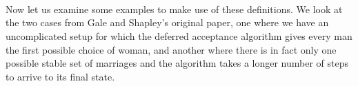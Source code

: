 {\begin{code}
\AgdaSymbol{)}\AgdaSpace{}%
\AgdaOperator{\AgdaInductiveConstructor{,}}\AgdaSpace{}%
\AgdaSpace{}%
\AgdaSymbol{(}\AgdaSpace{}%
\AgdaSymbol{)}\AgdaSpace{}%
\AgdaSymbol{)}\AgdaSpace{}%
\AgdaOperator{\AgdaInductiveConstructor{,}}\<%
\\
\>[.]\<[2578I]%
\>[12]\AgdaSymbol{(}\AgdaSpace{}%
\AgdaSymbol{(}\AgdaSpace{}%
\AgdaSymbol{)}\AgdaSpace{}%
\AgdaOperator{\AgdaInductiveConstructor{,}}\AgdaSpace{}%
\AgdaSpace{}%
\AgdaSymbol{(}\AgdaSpace{}%
\AgdaSymbol{)}\AgdaSpace{}%
\AgdaSymbol{))}\<%
\\
%
\>[10]\AgdaSymbol{(}%
\>[2594I]\AgdaSymbol{(}\AgdaSpace{}%
\AgdaSymbol{(}\AgdaSpace{}%
\AgdaSymbol{)}\AgdaSpace{}%
\AgdaOperator{\AgdaInductiveConstructor{,}}\AgdaSpace{}%
\AgdaSpace{}%
\AgdaSymbol{(}\AgdaSpace{}%
\AgdaSymbol{)}\AgdaSpace{}%
\AgdaSymbol{)}\AgdaSpace{}%
\AgdaOperator{\AgdaInductiveConstructor{,}}\<%
\\
\>[.]\<[2594I]%
\>[12]\AgdaSymbol{(}\AgdaSpace{}%
\AgdaSymbol{(}\AgdaSpace{}%
\AgdaSymbol{)}\AgdaSpace{}%
\AgdaOperator{\AgdaInductiveConstructor{,}}\AgdaSpace{}%
\AgdaSpace{}%
\AgdaSymbol{(}\AgdaSpace{}%
\AgdaSymbol{)}\AgdaSpace{}%
\AgdaSymbol{)))}\<%
\end{code}

Now let us examine some examples to make use of these definitions. We look at the two cases from Gale and Shapley's original paper, one where we have an uncomplicated setup for which the deferred acceptance algorithm gives every man the first possible choice of woman, and another where there is in fact only one possible stable set of marriages and the algorithm takes a longer number of steps to arrive to its final state.

}
